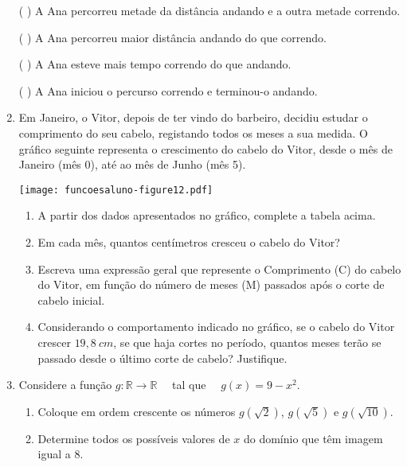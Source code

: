 \documentclass[extrafontsizes, twoside, 11pt, openright, final]{memoir}
\begin{document}
\begin{enumerate}
	      ( { } ) A Ana percorreu metade da distância andando e a outra metade correndo.

	      ( { } ) A Ana percorreu maior distância andando do que correndo.

	      ( { } ) A Ana esteve mais tempo correndo do que andando.

	      ( { } ) A Ana iniciou o percurso correndo e terminou-o andando.

	\item Em Janeiro, o Vitor, depois de ter vindo do barbeiro, decidiu estudar o comprimento do seu cabelo, registando todos os meses a sua medida. O gráfico seguinte representa o crescimento do cabelo do Vitor, desde o mês de Janeiro (mês 0), até ao mês de Junho (mês 5).
	      \label{\detokenize{AF106-E1:fig-cabelo}}

	      \begin{center}
		      \texttt{[image: funcoesaluno-figure12.pdf]}
	      \end{center}\begin{enumerate}
		      \item       A partir dos dados apresentados no gráfico, complete a tabela acima.

		      \item       Em cada mês, quantos centímetros cresceu o cabelo do Vitor?

		      \item       Escreva uma expressão geral que represente o Comprimento (C) do cabelo do Vitor, em função do número de meses (M) passados após o corte de cabelo inicial.

		      \item       Considerando o comportamento indicado no gráfico, se o cabelo do Vitor crescer $19,8 \ cm$, se que haja cortes no período, quantos meses terão se passado desde o último corte de cabelo? Justifique.

	      \end{enumerate}

	\item Considere a função $g:\mathbb{R}\to\mathbb{R}\quad$ tal que $\quad g(x)=9-x^2$.
	      \begin{enumerate}
		      \item       Coloque em ordem crescente os números $g(\sqrt{2})$, $g(\sqrt{5})$ e  $g(\sqrt{10})$.

		      \item       Determine todos os possíveis valores de $x$ do domínio que têm imagem igual a 8.


\end{enumerate}
\end{enumerate}
\end{document}

